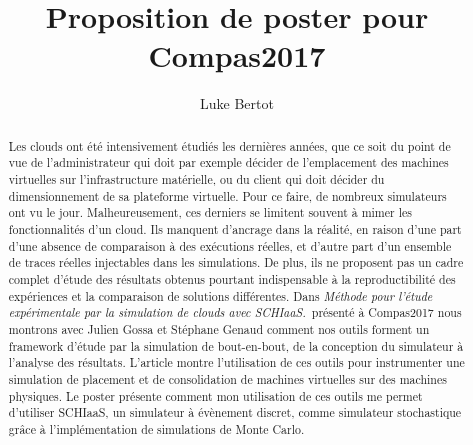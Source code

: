 \documentclass[parallelisme]{compas2017}
\title{Proposition de poster pour Compas2017}
\author{Luke Bertot}
\begin{document}
\maketitle


%

\begin{abstract} Les clouds ont été intensivement étudiés les dernières années,
	que ce soit du point de vue de l'administrateur qui doit par exemple
	décider de l'emplacement des machines virtuelles sur l'infrastructure
	matérielle, ou du client qui doit décider du dimensionnement de sa
	plateforme virtuelle. Pour ce faire, de nombreux simulateurs ont vu le
	jour. Malheureusement, ces derniers se limitent souvent à mimer les
	fonctionnalités d'un cloud. Ils manquent d'ancrage dans la réalité, en
	raison d'une part d'une absence de comparaison à des exécutions réelles,
	et d'autre part d'un ensemble de traces réelles injectables dans les
	simulations. De plus, ils ne proposent pas un cadre complet d'étude des
	résultats obtenus pourtant indispensable à la reproductibilité des
	expériences et la comparaison de solutions différentes. Dans
	\emph{Méthode pour l’étude expérimentale par la simulation de clouds
	avec SCHIaaS.}\ présenté à Compas2017 nous montrons avec Julien Gossa et
	Stéphane Genaud comment nos outils forment un framework d'étude par la
	simulation de bout-en-bout, de la conception du simulateur à l'analyse
	des résultats. L'article montre l'utilisation de ces outils pour
	instrumenter une simulation de placement et de consolidation de machines
	virtuelles sur des machines physiques. Le poster présente comment mon
	utilisation de ces outils me permet d'utiliser SCHIaaS, un simulateur à
	évènement discret, comme simulateur stochastique grâce à 
	l'implémentation de simulations de Monte Carlo.
	
	 \end{abstract}
\end{document}
